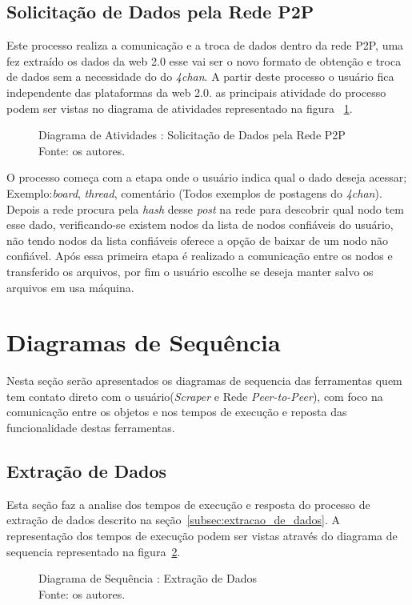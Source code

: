 \subsection{Solicitação de Dados pela Rede P2P\label{subsec:Solicitacao_Dados}}
Este processo realiza a comunicação e a troca de dados dentro da rede P2P, uma fez extraído os dados da web 2.0 esse vai ser o novo formato de obtenção e troca de dados sem a necessidade do 
do \textit{4chan}. A partir deste processo o usuário fica independente das plataformas da web 2.0. as principais atividade do processo podem ser vistas no diagrama de atividades 
representado na figura ~\ref{fig:Solicitacao_Dados}. 
\begin{figure}[H]
    
    \caption[Diagrama de Atividades : Solicitação de Dados pela Rede P2P]{\label{fig:Solicitacao_Dados}
        Diagrama de Atividades : Solicitação de Dados pela Rede P2P\\
        Fonte: os autores.
    }
\end{figure}
O processo começa com a etapa onde o usuário indica qual o dado deseja acessar; Exemplo:\textit{board}, \textit{thread}, comentário (Todos exemplos de postagens do \textit{4chan}). Depois a rede procura pela \textit{hash} desse \textit{post} na rede para descobrir qual nodo tem esse dado, verificando-se existem nodos da lista de nodos confiáveis do usuário, não tendo nodos da lista confiáveis oferece a opção de baixar
de um nodo não confiável. Após essa primeira etapa é realizado a comunicação entre os nodos e transferido os arquivos, por fim o usuário escolhe se deseja manter salvo os arquivos 
em usa máquina. 
\section{Diagramas de Sequência}
Nesta seção serão apresentados os diagramas de sequencia das ferramentas quem tem contato direto com o usuário(\textit{Scraper} e Rede \textit{Peer-to-Peer}), com foco na comunicação entre os objetos e nos tempos de execução e reposta das funcionalidade destas ferramentas.
\subsection{Extração de Dados}
Esta seção faz a analise dos tempos de execução e resposta do processo de extração de dados descrito na seção~\ref{subsec:extracao_de_dados}. A representação dos tempos de execução podem ser vistas através do diagrama de sequencia representado na figura~\ref{fig:seq_extracao_dados}. 
\begin{figure}[H]
    
    \caption[Diagrama de Sequência : Extração de Dados]{\label{fig:seq_extracao_dados}
        Diagrama de Sequência : Extração de Dados\\
        Fonte: os autores.
    }
\end{figure}

